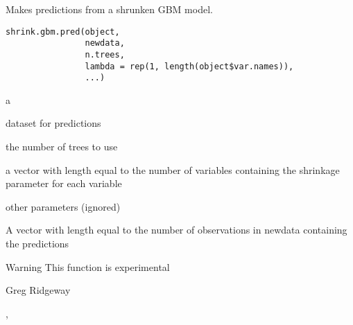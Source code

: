 \documentclass{article}
\begin{document}
\begin{Description}\relax
Makes predictions from a shrunken GBM model.
\end{Description}
\begin{Usage}
\begin{verbatim}
shrink.gbm.pred(object, 
                newdata, 
                n.trees, 
                lambda = rep(1, length(object$var.names)), 
                ...)
\end{verbatim}
\end{Usage}
\begin{Arguments}
\begin{ldescription}
\item[\code{object}] a  
\item[\code{newdata}] dataset for predictions 
\item[\code{n.trees}] the number of trees to use 
\item[\code{lambda}] a vector with length equal to the number of variables containing the shrinkage parameter for each variable 
\item[\code{...}] other parameters (ignored) 
\end{ldescription}
\end{Arguments}
\begin{Value}
A vector with length equal to the number of observations in newdata containing the predictions
\end{Value}
\begin{Section}{Warning}
This function is experimental
\end{Section}
\begin{Author}\relax
Greg Ridgeway 
\end{Author}
\begin{SeeAlso}\relax
{}, 
\end{SeeAlso}
\end{document}
